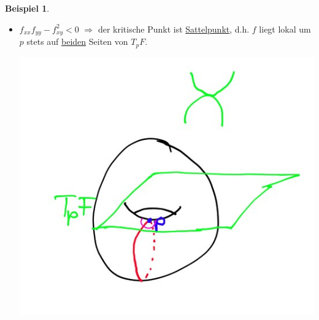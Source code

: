 \documentclass[a4paper,11pt,notitlepage]{report}
\theoremstyle{definition}
\newtheorem{example}{Beispiel}[chapter]
\begin{document}
\begin{example}
\begin{itemize}
	\item $f_{xx} f_{yy} - f_{xy}^2 < 0$
	\newline
	$\Rightarrow$ der kritische Punkt ist \underline{Sattelpunkt}, d.h. $f$ liegt lokal um $p$ stets auf \underline{beiden} Seiten von $T_p F$.
	\begin{center}
		\includegraphics[scale=0.4]{images/2012_01_26_Bild6.jpg}
	\end{center}

\end{itemize}
\end{example}
\end{document}
